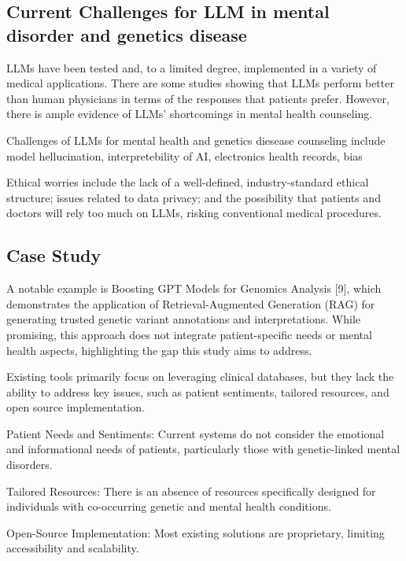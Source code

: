 \documentclass{article} %
\begin{document}
\subsection{Current Challenges for LLM in mental disorder and genetics disease}


LLMs have been tested and, to a limited degree, implemented in a variety of medical applications. There are some studies showing that LLMs perform better than human physicians in terms of the responses that patients prefer. However, there is ample evidence of LLMs' shortcomings in mental health counseling\citet{chung2023challengeslargelanguagemodels}.

Challenges of LLMs for mental health and genetics diesease counseling include model hellucination, interpretebility of AI, electronics health records, bias

Ethical worries include the lack of a well-defined, industry-standard ethical structure; issues related to data privacy; and the possibility that patients and doctors will rely too much on LLMs, risking conventional medical procedures. 



\subsection{Case Study}


A notable example is Boosting GPT Models for Genomics Analysis [9], which demonstrates the application of Retrieval-Augmented Generation (RAG) for generating trusted genetic variant annotations and interpretations. While promising, this approach does not integrate patient-specific needs or mental health aspects, highlighting the gap this study aims to address.


Existing tools primarily focus on leveraging clinical databases, but they lack the ability to address key issues, such as patient sentiments, tailored resources, and open source implementation.

Patient Needs and Sentiments: Current systems do not consider the emotional and informational needs of patients, particularly those with genetic-linked mental disorders.

Tailored Resources: There is an absence of resources specifically designed for individuals with co-occurring genetic and mental health conditions.

Open-Source Implementation: Most existing solutions are proprietary, limiting accessibility and scalability.
\end{document}
